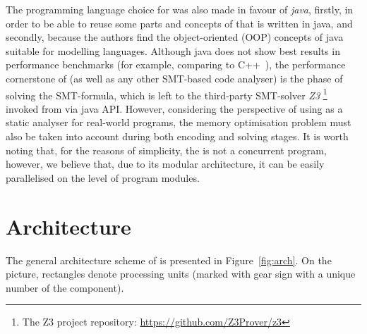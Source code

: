 The programming language choice for \porthos[2] was also made in favour of \textit{java}, firstly, in order to be able to reuse some parts and concepts of \porthos[1] that is written in java, and secondly, because the authors find the object-oriented (OOP) concepts of java suitable for modelling languages.
Although java does not show best results in performance benchmarks (for example, comparing to C++~\cite{hundt2011loop, oaks2014java}), the performance cornerstone of \porthos[2] (as well as any other SMT-based code analyser) is the phase of solving the SMT-formula, which is left to the third-party SMT-solver \textit{Z3}%
\footnote{The Z3 project repository: \url{https://github.com/Z3Prover/z3}} %
invoked from \porthos[2] via java API.
However, considering the perspective of using \porthos[2] as a static analyser for real-world programs, the memory optimisation problem must also be taken into account during both encoding and solving stages.
It is worth noting that, for the reasons of simplicity, the \porthos[2] is not a concurrent program, however, we believe that, due to its modular architecture, it can be easily parallelised on the level of program modules.


\section{Architecture}
\label{ch:impl:arch}

The general architecture scheme of \porthos[2] is presented in Figure~\ref{fig:arch}. On the picture, rectangles denote processing units (marked with gear sign with a unique number of the component).

